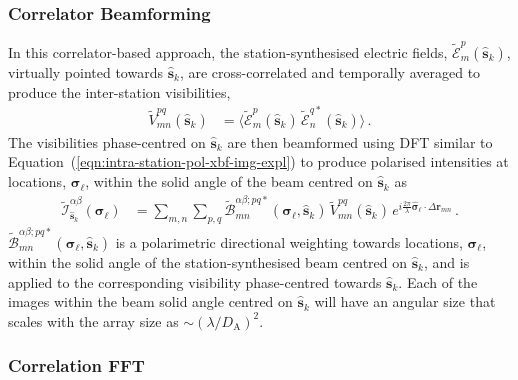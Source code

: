 \documentclass[
  journal=pasa,
  manuscript=article-type,
  year=2020,
  volume=37,
]{cup-journal}
\begin{document}
\subsubsection{Correlator Beamforming}

In this correlator-based approach, the station-synthesised electric fields,
$\widetilde{\mathcal{E}}_m^p(\hat{\boldsymbol{s}}_k)$, virtually pointed towards $\hat{\boldsymbol{s}}_k$, are cross-correlated and temporally averaged to produce the inter-station visibilities, 
\begin{align}
    \widetilde{V}_{mn}^{pq}(\hat{\boldsymbol{s}}_k) &= \bigl\langle \widetilde{\mathcal{E}}_m^p(\hat{\boldsymbol{s}}_k) \, \widetilde{\mathcal{E}}_n^{q*}(\hat{\boldsymbol{s}}_k)\bigr\rangle \, . \label{eqn:inter-station-pol-visibilities}
\end{align}
The visibilities phase-centred on $\hat{\boldsymbol{s}}_k$ are then beamformed using DFT similar to Equation~(\ref{eqn:intra-station-pol-xbf-img-expl}) to produce polarised intensities at locations, $\boldsymbol{\sigma}_\ell$, within the solid angle of the beam centred on $\hat{\boldsymbol{s}}_k$ as 
\begin{align}
    \widetilde{\mathcal{I}}^{\alpha\beta}_{\hat{\boldsymbol{s}}_k}(\boldsymbol{\sigma}_\ell)
    &= \sum_{m,n} \sum_{p,q} \widetilde{\mathcal{B}}_{mn}^{\alpha\beta;pq*}(\boldsymbol{\sigma}_\ell, \hat{\boldsymbol{s}}_k) \, \widetilde{V}_{mn}^{pq}(\hat{\boldsymbol{s}}_k) \,  e^{i\frac{2\pi}{\lambda} \hat{\boldsymbol{\sigma}}_\ell\cdot\Delta\boldsymbol{r}_{m n}} \, . \label{eqn:inter-station-pol-xbf-img-expl} 
\end{align}
$\widetilde{\mathcal{B}}_{mn}^{\alpha\beta;pq*}(\boldsymbol{\sigma}_\ell,\hat{\boldsymbol{s}}_k)$ is a polarimetric directional weighting towards locations, $\boldsymbol{\sigma}_\ell$, within the solid angle of the station-synthesised beam centred on $\hat{\boldsymbol{s}}_k$, and is applied to the corresponding visibility phase-centred towards $\hat{\boldsymbol{s}}_k$. Each of the images within the beam solid angle centred on $\hat{\boldsymbol{s}}_k$ will have an angular size that scales with the array size as $\sim (\lambda/D_\textrm{A})^2$. 

\subsubsection{Correlation FFT}
\end{document}
